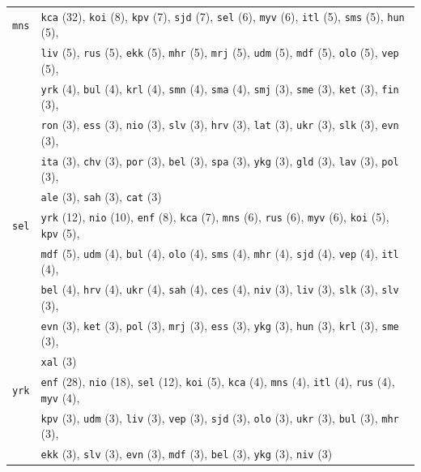\begin{center}
\begin{longtable}{ll}
\texttt{mns} & \texttt{kca} (32), \texttt{koi} (8), \texttt{kpv} (7), \texttt{sjd} (7), \texttt{sel} (6), \texttt{myv} (6), \texttt{itl} (5), \texttt{sms} (5), \texttt{hun} (5), \\
 & \texttt{liv} (5), \texttt{rus} (5), \texttt{ekk} (5), \texttt{mhr} (5), \texttt{mrj} (5), \texttt{udm} (5), \texttt{mdf} (5), \texttt{olo} (5), \texttt{vep} (5), \\
 & \texttt{yrk} (4), \texttt{bul} (4), \texttt{krl} (4), \texttt{smn} (4), \texttt{sma} (4), \texttt{smj} (3), \texttt{sme} (3), \texttt{ket} (3), \texttt{fin} (3), \\
 & \texttt{ron} (3), \texttt{ess} (3), \texttt{nio} (3), \texttt{slv} (3), \texttt{hrv} (3), \texttt{lat} (3), \texttt{ukr} (3), \texttt{slk} (3), \texttt{evn} (3), \\
 & \texttt{ita} (3), \texttt{chv} (3), \texttt{por} (3), \texttt{bel} (3), \texttt{spa} (3), \texttt{ykg} (3), \texttt{gld} (3), \texttt{lav} (3), \texttt{pol} (3), \\
 & \texttt{ale} (3), \texttt{sah} (3), \texttt{cat} (3) \\
\texttt{sel} & \texttt{yrk} (12), \texttt{nio} (10), \texttt{enf} (8), \texttt{kca} (7), \texttt{mns} (6), \texttt{rus} (6), \texttt{myv} (6), \texttt{koi} (5), \texttt{kpv} (5), \\
 & \texttt{mdf} (5), \texttt{udm} (4), \texttt{bul} (4), \texttt{olo} (4), \texttt{sms} (4), \texttt{mhr} (4), \texttt{sjd} (4), \texttt{vep} (4), \texttt{itl} (4), \\
 & \texttt{bel} (4), \texttt{hrv} (4), \texttt{ukr} (4), \texttt{sah} (4), \texttt{ces} (4), \texttt{niv} (3), \texttt{liv} (3), \texttt{slk} (3), \texttt{slv} (3), \\
 & \texttt{evn} (3), \texttt{ket} (3), \texttt{pol} (3), \texttt{mrj} (3), \texttt{ess} (3), \texttt{ykg} (3), \texttt{hun} (3), \texttt{krl} (3), \texttt{sme} (3), \\
 & \texttt{xal} (3) \\
\texttt{yrk} & \texttt{enf} (28), \texttt{nio} (18), \texttt{sel} (12), \texttt{koi} (5), \texttt{kca} (4), \texttt{mns} (4), \texttt{itl} (4), \texttt{rus} (4), \texttt{myv} (4), \\
 & \texttt{kpv} (3), \texttt{udm} (3), \texttt{liv} (3), \texttt{vep} (3), \texttt{sjd} (3), \texttt{olo} (3), \texttt{ukr} (3), \texttt{bul} (3), \texttt{mhr} (3), \\
 & \texttt{ekk} (3), \texttt{slv} (3), \texttt{evn} (3), \texttt{mdf} (3), \texttt{bel} (3), \texttt{ykg} (3), \texttt{niv} (3) \\

\end{longtable}
\end{center}
